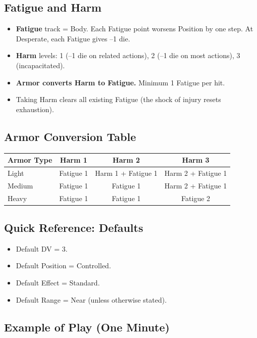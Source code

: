 \subsection*{Fatigue and Harm}

\begin{itemize}
  \item \textbf{Fatigue} track = Body. Each Fatigue point worsens Position by one step. At Desperate, each Fatigue gives –1 die.
  \item \textbf{Harm} levels: 1 (–1 die on related actions), 2 (–1 die on most actions), 3 (incapacitated).
  \item \textbf{Armor converts Harm to Fatigue.} Minimum 1 Fatigue per hit.
  \item Taking Harm clears all existing Fatigue (the shock of injury resets exhaustion).
\end{itemize}

\subsection*{Armor Conversion Table}

\begin{tabular}{@{}lccc@{}}
\toprule
\textbf{Armor Type} & \textbf{Harm 1} & \textbf{Harm 2} & \textbf{Harm 3} \\
\midrule
Light  & Fatigue 1 & Harm 1 + Fatigue 1 & Harm 2 + Fatigue 1 \\
Medium & Fatigue 1 & Fatigue 1 & Harm 2 + Fatigue 1 \\
Heavy  & Fatigue 1 & Fatigue 1 & Fatigue 2 \\
\bottomrule
\end{tabular}

\subsection*{Quick Reference: Defaults}

\begin{itemize}
  \item Default DV = 3.
  \item Default Position = Controlled.
  \item Default Effect = Standard.
  \item Default Range = Near (unless otherwise stated).
\end{itemize}

\subsection*{Example of Play (One Minute)}

